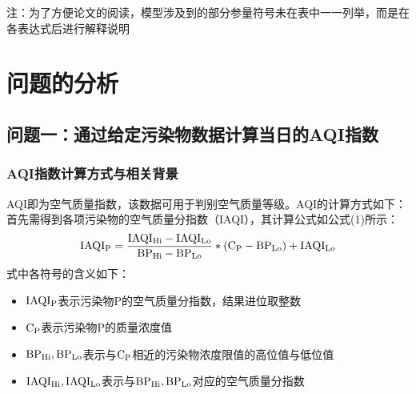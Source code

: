 \documentclass[bwprint]{gmcmthesis}
\numberwithin{figure}{section}
\begin{document}
注：为了方便论文的阅读，模型涉及到的部分参量符号未在表中一一列举，而是在各表达式后进行解释说明
\section{问题的分析}
\subsection{问题一：通过给定污染物数据计算当日的AQI指数}
\subsubsection{AQI指数计算方式与相关背景}
AQI即为空气质量指数，该数据可用于判别空气质量等级。AQI的计算方式如下：
首先需得到各项污染物的空气质量分指数（IAQI），其计算公式如公式(1)所示：
\begin{equation}
	\rm IAQI_P = \frac{IAQI_{Hi}-IAQI_{Lo}}{BP_{Hi}-BP_{Lo}}*(C_P-BP_{Lo})+IAQI_{Lo}
\end{equation}
式中各符号的含义如下：
\begin{itemize}
	\item $\rm IAQI_P$表示污染物P的空气质量分指数，结果进位取整数
	\item $\rm C_P$表示污染物P的质量浓度值
	\item $\rm BP_{Hi}, BP_{Lo}$表示与$\rm C_P$相近的污染物浓度限值的高位值与低位值
	\item $\rm IAQI_{Hi}, IAQI_{Lo}$表示与$\rm BP_{Hi},BP_{Lo}$对应的空气质量分指数
\end{itemize}
\end{document}
